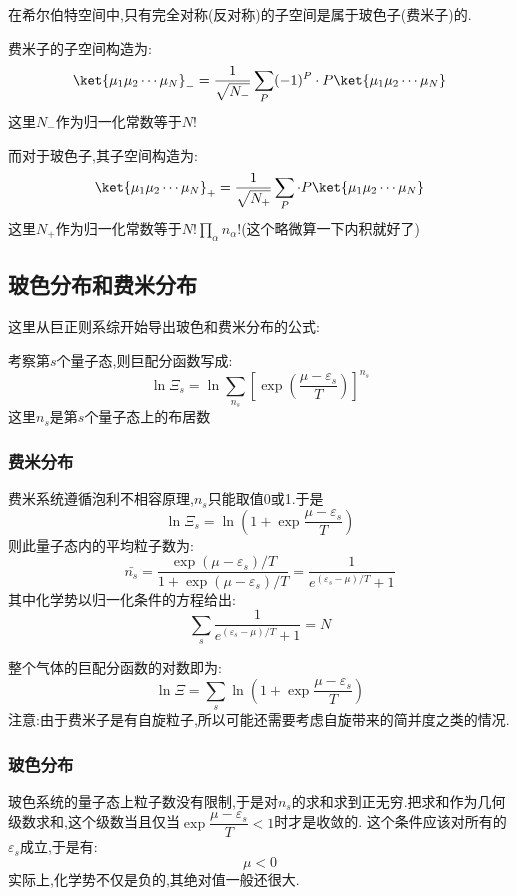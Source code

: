     在希尔伯特空间中,只有完全对称(反对称)的子空间是属于玻色子(费米子)的.

    费米子的子空间构造为:
    \begin{equation}
      \ket{\mu_1 \mu_2 \cdots \mu_N}_-=\dfrac{1}{\sqrt{N_-}}\sum_P (-1)^{P} \cdot P\ket{\mu_1 \mu_2 \cdots \mu_N}
    \end{equation}
    这里$N_-$作为归一化常数等于$N!$

    而对于玻色子,其子空间构造为:
    \begin{equation}
      \ket{\mu_1 \mu_2 \cdots \mu_N}_+=\dfrac{1}{\sqrt{N_+}} \sum_P \cdot P\ket{\mu_1 \mu_2 \cdots \mu_N}
    \end{equation}
    这里$N_+$作为归一化常数等于$N!\prod_{\alpha}^{} n_\alpha !$(这个略微算一下内积就好了)


\subsection{玻色分布和费米分布}
    这里从巨正则系综开始导出玻色和费米分布的公式:

    考察第$s$个量子态,则巨配分函数写成:
    \begin{equation}
      \ln \Xi_s=\ln \sum_{n_s}\left[ \exp(\dfrac{\mu-\varepsilon_s}{T}) \right] ^{n_s}
    \end{equation}
    这里$n_s$是第$s$个量子态上的布居数
\subsubsection{费米分布}
    费米系统遵循泡利不相容原理,$n_s$只能取值0或1.于是
    \begin{equation}
      \ln \Xi_s = \ln(1+\exp\dfrac{\mu-\varepsilon_s}{T})
    \end{equation}
    则此量子态内的平均粒子数为:
    \begin{equation}
      \bar{n_s}=\dfrac{\exp(\mu-\varepsilon_s) / T}{1+ \exp (\mu -\varepsilon _s) / T}=\dfrac{1}{e^{(\varepsilon_s-\mu) / T}+1}
    \end{equation}
    其中化学势以归一化条件的方程给出:
    \[\sum_s \dfrac{1}{e^{(\varepsilon_s - \mu) / T}+1}=N\]
    
    整个气体的巨配分函数的对数即为:
    \begin{equation}
      \ln\Xi=\sum_s \ln(1+\exp\dfrac{\mu- \varepsilon_s}{T})
    \end{equation}
    注意:由于费米子是有自旋粒子,所以可能还需要考虑自旋带来的简并度之类的情况.

\subsubsection{玻色分布}
    玻色系统的量子态上粒子数没有限制,于是对$n_s$的求和求到正无穷.把求和作为几何级数求和,这个级数当且仅当$\exp\dfrac{\mu-\varepsilon_s}{T}<1$时才是收敛的. 这个条件应该对所有的$\varepsilon_s$成立,于是有:
    \[\mu<0\]
    实际上,化学势不仅是负的,其绝对值一般还很大.

